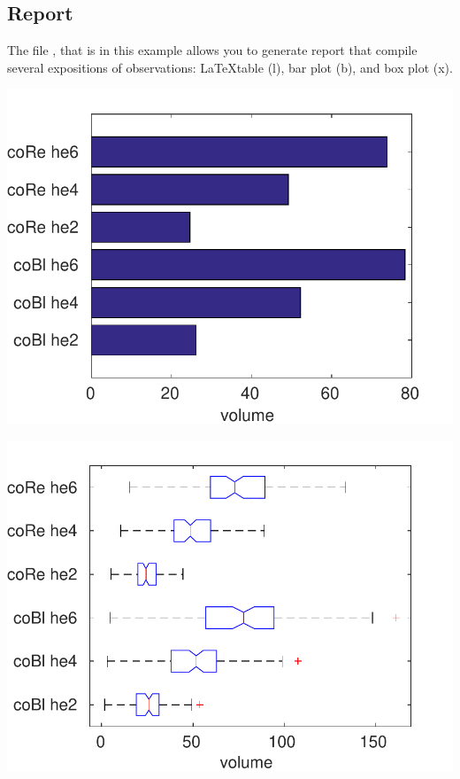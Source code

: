 \documentclass[a4paper,fleqn]{tufte-handout}
\begin{document}
\subsection{Report}

\begin{margintable}
\caption{\LaTeX output.}

\end{margintable}

The file , that is  in this example allows you to generate report that compile several expositions of observations: \LaTeX table (l), bar plot (b), and box plot (x).



\begin{marginfigure}
\includegraphics[width=\textwidth]{../demo/geometricShape/report/figures/geob}
\end{marginfigure}


\begin{marginfigure}
\includegraphics[width=\textwidth]{../demo/geometricShape/report/figures/geox}
\end{marginfigure}
\end{document}

